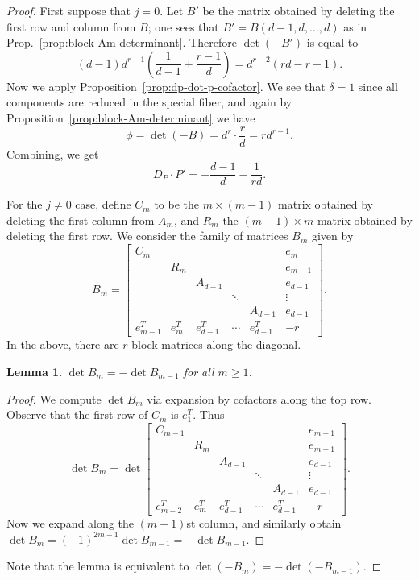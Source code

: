 \documentclass[reqno]{amsart}
\newtheorem{lemma}[thm]{Lemma}
\theoremstyle{definition}
\theoremstyle{remark}
\begin{document}
\begin{proof}
  First suppose that $j = 0$. Let $B'$ be the matrix obtained by deleting the first row and column from $B$; one sees that $B' = B(d-1, d, \dots,d)$ as in Prop.~\ref{prop:block-Am-determinant}. Therefore $\det (-B')$ is equal to
  \[
  (d-1)d^{r-1}\left(\frac{1}{d-1} + \frac{r-1}{d}\right) = d^{r-2}(rd-r+1).
  \]
  Now we apply Proposition~\ref{prop:dp-dot-p-cofactor}. We see that $\delta = 1$ since all components are reduced in the special fiber, and again by Proposition~\ref{prop:block-Am-determinant} we have
  \[
  \phi = \det (-B) = d^{r}\cdot \frac{r}{d} = rd^{r-1}.
  \]
  Combining, we get
  \[
  D_P \cdot P' = -\frac{d-1}{d} - \frac{1}{rd}.
  \]

  For the $j \neq 0$ case, define $C_{m}$ to be the $m \times (m-1)$ matrix obtained by deleting the first column from $A_m$, and $R_m$ the $(m-1) \times m$ matrix obtained by deleting the first row. We consider the family of matrices $B_m$ given by
  \[
  B_m =   \left[\begin{array}{cccccc}
C_{m} & & & & & e_{m} \\
& R_m & & & & e_{m-1} \\
& & A_{d-1} & & & e_{d-1} \\
& & & \ddots & & \vdots \\
& & & & A_{d-1} & e_{d-1} \\
e_{m-1}^T & e_{m}^T & e_{d-1}^T & \cdots & e_{d-1}^T & -r
\end{array}\right].
  \]
  In the above, there are $r$ block matrices along the diagonal.

  \begin{lemma}
    $\det B_m = -\det B_{m-1}$ for all $m \geq 1$.
  \end{lemma}

  \begin{proof}
    We compute $\det B_m$ via expansion by cofactors along the top row. Observe that the first row of $C_m$ is $e_{1}^T$. Thus 
    \[
    \det B_m = \det \left[
      \begin{array}{cccccc}
        C_{m-1} & & & & & e_{m-1} \\
        & R_m & & & & e_{m-1} \\
        & & A_{d-1} & & & e_{d-1} \\
        & & & \ddots & & \vdots \\
        & & & & A_{d-1} & e_{d-1} \\
        e_{m-2}^T & e_{m}^T & e_{d-1}^T & \cdots & e_{d-1}^T & -r
      \end{array}\right].
    \]
    Now we expand along the $(m-1)$st column, and similarly obtain $\det B_m = (-1)^{2m-1}\det B_{m-1} = - \det B_{m-1}$.
  \end{proof}
  Note that the lemma is equivalent to $\det (-B_m) = - \det (-B_{m-1})$.


\end{proof}
\end{document}
